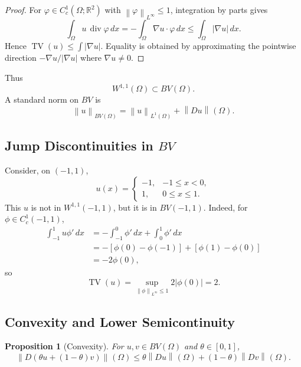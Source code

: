 \documentclass[11pt]{article}
\newcommand{\Om}{\Omega}
\newcommand{\R}{\mathbb{R}}
\newcommand{\TV}{\operatorname{TV}}
\newcommand{\Div}{\operatorname{div}}
\newcommand{\norm}[2][]{\left\lVert #2\right\rVert_{#1}}
\theoremstyle{definition}
\theoremstyle{plain}
\newtheorem{proposition}[definition]{Proposition}
\begin{document}
\begin{proof}
For $\varphi\in C_c^1(\Om;\R^2)$ with $\norm[L^\infty]{\varphi}\le1$, integration by parts gives
\[
\int_{\Om}u\,\Div\varphi\,dx
=-\int_{\Om}\nabla u\cdot\varphi\,dx
\le \int_{\Om}|\nabla u|\,dx.
\]
Hence $\TV(u)\le\int|\nabla u|$. Equality is obtained by approximating the pointwise direction $-\nabla u/|\nabla u|$ where $\nabla u\ne0$.
\end{proof}

Thus
\[
W^{1,1}(\Om)\subset BV(\Om).
\]
A standard norm on $BV$ is
\[
\norm[BV(\Om)]{u}
=\norm[L^1(\Om)]{u}+\norm{Du}(\Om).
\]

\subsection{Jump Discontinuities in $BV$}
Consider, on $(-1,1)$,
\[
u(x)=
\begin{cases}
-1,&-1\le x<0,\\
1,&0\le x\le1.
\end{cases}
\]
This $u$ is not in $W^{1,1}(-1,1)$, but it is in $BV(-1,1)$. Indeed, for $\phi\in C_c^1(-1,1)$,
\begin{align*}
\int_{-1}^1u\phi'\,dx
&=-\int_{-1}^0\phi'\,dx+\int_0^1\phi'\,dx\\
&=-[\phi(0)-\phi(-1)]+[\phi(1)-\phi(0)]\\
&=-2\phi(0),
\end{align*}
so
\[
\TV(u)=\sup_{\norm[L^\infty]{\phi}\le1}2|\phi(0)|=2.
\]

\begin{center}
\end{center}

\subsection{Convexity and Lower Semicontinuity}
\begin{proposition}[Convexity]
For $u,v\in BV(\Om)$ and $\theta\in[0,1]$,
\[
\norm{D(\theta u+(1-\theta)v)}(\Om)
\le \theta\norm{Du}(\Om)+(1-\theta)\norm{Dv}(\Om).
\]
\end{proposition}
\end{document}
